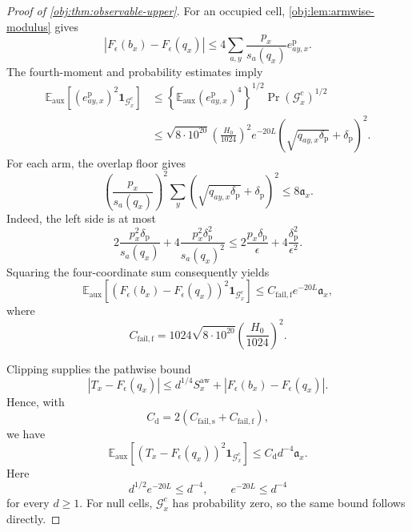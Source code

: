 \documentclass[11pt]{article}
\begin{document}
\begin{proof}[Proof of \cref{obj:thm:observable-upper}]
For an occupied cell, \cref{obj:lem:armwise-modulus} gives
\[
|F_\epsilon(b_x)-F_\epsilon(q_x)|
\le
4\sum_{a,y}\frac{p_x}{s_a(q_x)}e_{ay,x}^{\mathrm p}.
\]
The fourth-moment and probability estimates imply
\[
\begin{aligned}
\mathbb E_{\mathrm{aux}}
[(e_{ay,x}^{\mathrm p})^2\mathbf1_{\mathcal G_x^c}]
&\le
\left\{\mathbb E_{\mathrm{aux}}(e_{ay,x}^{\mathrm p})^4\right\}^{1/2}
\Pr(\mathcal G_x^c)^{1/2}\\
&\le
\sqrt{8\cdot10^{20}}
\left(\frac{H_0}{1024}\right)^2
e^{-20L}
\left(\sqrt{q_{ay,x}\delta_{\mathrm p}}+\delta_{\mathrm p}\right)^2.
\end{aligned}
\]
For each arm, the overlap floor gives
\[
\left(\frac{p_x}{s_a(q_x)}\right)^2
\sum_y
\left(\sqrt{q_{ay,x}\delta_{\mathrm p}}+\delta_{\mathrm p}\right)^2
\le8\mathfrak a_x.
\]
Indeed, the left side is at most
\[
2\frac{p_x^2\delta_{\mathrm p}}{s_a(q_x)}
+
4\frac{p_x^2\delta_{\mathrm p}^2}{s_a(q_x)^2}
\le
2\frac{p_x\delta_{\mathrm p}}{\epsilon}
+
4\frac{\delta_{\mathrm p}^2}{\epsilon^2}.
\]
Squaring the four-coordinate sum consequently yields
\[
\mathbb E_{\mathrm{aux}}
[(F_\epsilon(b_x)-F_\epsilon(q_x))^2\mathbf1_{\mathcal G_x^c}]
\le C_{\mathrm{fail,f}}e^{-20L}\mathfrak a_x,
\]
where
\[
C_{\mathrm{fail,f}}
=
1024\sqrt{8\cdot10^{20}}
\left(\frac{H_0}{1024}\right)^2.
\]

Clipping supplies the pathwise bound
\[
|T_x-F_\epsilon(q_x)|
\le
d^{1/4}S_x^{\mathrm{aw}}
+
|F_\epsilon(b_x)-F_\epsilon(q_x)|.
\]
Hence, with
\[
C_{\mathrm d}=2(C_{\mathrm{fail,s}}+C_{\mathrm{fail,f}}),
\]
we have
\[
\mathbb E_{\mathrm{aux}}
[(T_x-F_\epsilon(q_x))^2\mathbf1_{\mathcal G_x^c}]
\le C_{\mathrm d}d^{-4}\mathfrak a_x.
\]
Here
\[
d^{1/2}e^{-20L}\le d^{-4},
\qquad e^{-20L}\le d^{-4}
\]
for every \(d\ge1\). For null cells, \(\mathcal G_x^c\) has probability zero, so the same bound follows directly.


\end{proof}
\end{document}
